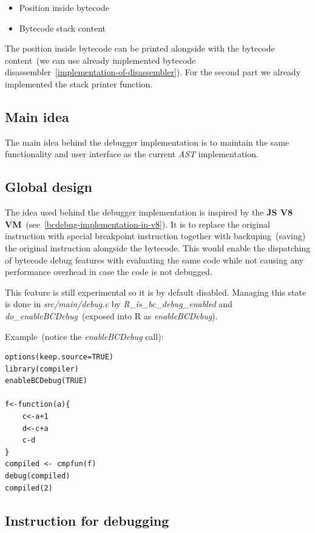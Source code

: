 \documentclass[thesis=M,english]{FITthesis}[2018/10/20]
\begin{document}
\begin{itemize}
	\item Position inside bytecode
	\item Bytecode stack content
\end{itemize}

The position inside bytecode can be printed alongside with the bytecode content~(we can use already implemented bytecode disassembler~\ref{implementation-of-disassembler}). For the second part we already implemented the stack printer function.

\subsection{Main idea}

The main idea behind the debugger implementation is to maintain the same functionality and user interface as the current \textit{AST} implementation.

\subsection{Global design}

The idea used behind the debugger implementation is inspired by the \textbf{JS V8 VM}~(see~\ref{bcdebug-implementation-in-v8}). It is to replace the original instruction with special breakpoint instruction together with backuping~(saving) the original instruction alongside the bytecode. This would enable the dispatching of bytecode debug features with evaluating the same code while not causing any performance overhead in case the code is not debugged.

This feature is still experimental so it is by default disabled. Managing this state is done in \textit{src/main/debug.c} by \textit{R{\_}is{\_}bc{\_}debug{\_}enabled} and \textit{do{\_}enableBCDebug}~(exposed into R as \textit{enableBCDebug}).

Example~(notice the \textit{enableBCDebug} call):
\begin{lstlisting}
options(keep.source=TRUE)
library(compiler)
enableBCDebug(TRUE)

f<-function(a){
    c<-a+1
    d<-c+a
    c-d
}
compiled <- cmpfun(f)
debug(compiled)
compiled(2)
\end{lstlisting}


\subsection{Instruction for debugging}\label{instruction-for-debugging}
\end{document}
